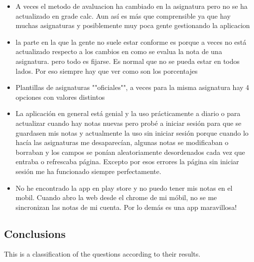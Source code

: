 \begin{itemize}
  \item A veces el metodo de avaluacion ha cambiado en la asignatura pero no se ha actualizado en grade calc. Aun así es más que comprensible ya que hay muchas asignaturas y posiblemente muy poca gente gestionando la aplicacion
  \item la parte en la que la gente no suele estar conforme es porque a veces no está actualizado respecto a los cambios en como se evalua la nota de una asignatura. pero todo es fijarse. Es normal que no se pueda estar en todos lados. Por eso siempre hay que ver como son los porcentajes
  \item Plantillas de asignaturas ""oficiales"", a veces para la misma asignatura hay 4 opciones con valores distintos
  \item La aplicación en general está genial y la uso prácticamente a diario o para actualizar cuando hay notas nuevas pero probé a iniciar sesión para que se guardasen mis notas y actualmente la uso sin iniciar sesión porque cuando lo hacía las asignaturas me desaparecían, algunas notas se modificaban o borraban y los campos se ponían aleatoriamente desordenados cada vez que entraba o refrescaba página. Excepto por esos errores la página sin iniciar sesión me ha funcionado siempre perfectamente.
  \item No he encontrado la app en play store y no puedo tener mis notas en el mobil. Cuando abro la web desde el chrome de mi móbil, no se me sincronizan las notas de mi cuenta. Por lo demás es una app maravillosa! 
\end{itemize}





\clearpage\newpage
\subsection{Conclusions}

This is a classification of the questions according to their results.

